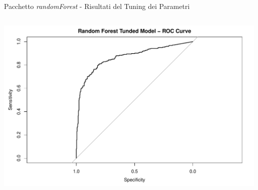 \documentclass[9pt, xcolor=table]{beamer}
\begin{document}
\begin{frame}{Pacchetto \textit{randomForest} - Risultati del Tuning dei Parametri}
\begin{columns}
			\centering
			\includegraphics[scale=0.26]{randomF-tuned-roc-curve}
		\end{columns}
	\end{frame}
\end{document}
